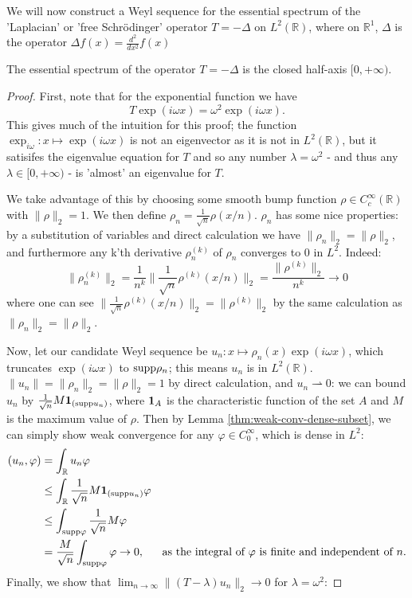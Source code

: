 \documentclass[../main.tex]{subfiles}
\begin{document}
We will now construct a Weyl sequence for the essential spectrum of the
'Laplacian' or 'free Schr\"odinger' operator $T = -\Delta$ on $L^2(\mathbb{R})$,
where on $\mathbb{R}^1$, $\Delta$ is the operator $\Delta f (x) =
\frac{d^2}{dx^2} f(x)$

\begin{example}
  The essential spectrum of the operator $T = -\Delta$ is the closed half-axis
  $[0, +\infty)$. 
\end{example}
\begin{proof}
First, note that for the exponential function we have 
\begin{equation}\label{eqn:laplace-eigenvector}
T\exp(i\omega x) = \omega^2 \exp(i\omega x).
\end{equation}
This gives much of the intuition for this proof; the function $\exp_{i \omega}:
x \mapsto \exp(i\omega x)$ is not an eigenvector as it is not in
$L^2(\mathbb{R})$, but it satisifes the eigenvalue equation for $T$ and
so any number $\lambda = \omega^2$ -
and thus any $\lambda \in [0, +\infty)$ - is 'almost' an eigenvalue for $T$.

We take advantage of this by choosing some smooth bump function $\rho \in
C^\infty_c(\mathbb{R})$ with $\|\rho\|_2 = 1$. We then define $\rho_n =
\frac{1}{\sqrt{n}}\rho(x/n)$. $\rho_n$ has some nice properties: by a
substitution of variables and direct calculation we have $\|\rho_n\|_2 =
\|\rho\|_2$, and furthermore any k'th derivative $\rho_n^{(k)}$ of
$\rho_n$ 
converges to 0 in $L^2$. Indeed:
\begin{equation}
\label{eqn:rhokn-vanishes}
\|\rho_n^{(k)}\|_2 = \frac{1}{n^k}\|\frac{1}{\sqrt{n}}\rho^{(k)}(x/n)\|_2 
		   = \frac{\|\rho^{(k)}\|_2}{n^k} 
		   \rightarrow 0
\end{equation}
where one can see $\|\frac{1}{\sqrt{n}}\rho^{(k)}(x/n)\|_2 = \|\rho^{(k)}\|_2$
by the same calculation as  $\|\rho_n\|_2 = \|\rho\|_2$.

Now, let our candidate Weyl sequence be $u_n: x \mapsto \rho_n(x)\exp(i\omega x)$,
which truncates $\exp(i\omega x)$ to $\mathrm{supp} \rho_n$; this means $u_n$ is in
$L^2(\mathbb{R})$. $\|u_n\| = \|\rho_n\|_2 = \|\rho\|_2 = 1$ by direct
calculation, and $u_n \rightharpoonup 0$: we can bound $u_n$ by
$\frac{1}{\sqrt{n}} M \mathbf{1}_{(\mathrm{supp} u_n)}$, where $\mathbf{1}_A$ is the
characteristic function of the set $A$ and $M$ is the maximum value of
$\rho$. Then by Lemma \ref{thm:weak-conv-dense-subset}, we can simply
show weak convergence for any $\varphi \in C_0^\infty$, which is dense
in $L^2$:
\begin{align*}
( u_n, \varphi ) & = \int_{\mathbb{R}}u_n \varphi & \\
& \leq \int_{\mathbb{R}} \frac{1}{\sqrt{n}} M \mathbf{1}_{(\mathrm{supp} u_n)} \varphi & \\
& \leq \int_{\mathrm{supp} \varphi} \frac{1}{\sqrt{n}} M  \varphi & \\
& = \frac{M}{\sqrt{n}} \int_{\mathrm{supp} \varphi} \varphi \rightarrow 0, 
  & \text{as the integral of $\varphi$ is finite and independent of $n$.}
\end{align*}
Finally, we show that $\lim_{n \rightarrow \infty}\|(T - \lambda)u_n\|_2 \rightarrow 0$
for $\lambda = \omega^2$:


\end{proof}
\end{document}
